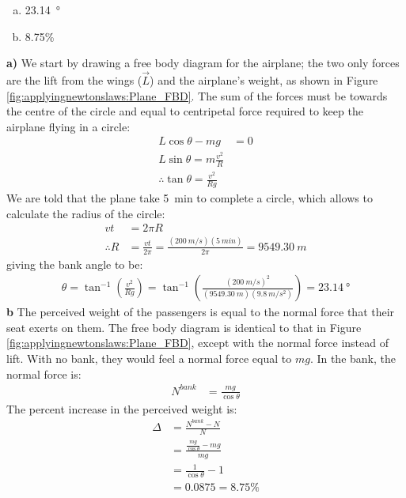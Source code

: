 \begin{finalanswer}
\begin{enumerate}[(a)]
\item \SI{23.14}{\degree}
\item 8.75\%
\end{enumerate}
\end{finalanswer}
\begin{solution}
\textbf{a)} We start by drawing a free body diagram for the airplane; the two only forces are the lift from the wings ($\vec L$) and the airplane's weight, as shown in Figure \ref{fig:applyingnewtonslaws:Plane_FBD}.
The sum of the forces must be towards the centre of the circle and equal to centripetal force required to keep the airplane flying in a circle:
\begin{align*}
L\cos\theta-mg&=0\\
L\sin\theta=m\frac{v^2}{R}\\
\therefore \tan\theta = \frac{v^2}{Rg}
\end{align*}
We are told that the plane take \SI{5}{min} to complete a circle, which allows to calculate the radius of the circle:
\begin{align*}
vt&=2\pi R\\
\therefore R&=\frac{vt}{2\pi}=\frac{(\SI{200}{m/s})(\SI{5}{min})}{2\pi}=\SI{9549.30}{m}
\end{align*}
giving the bank angle to be:
\begin{align*}
\theta = \tan^{-1}\left(\frac{v^2}{Rg}\right)=\tan^{-1}\left(\frac{(\SI{200}{m/s})^2}{(\SI{9549.30}{m})(\SI{9.8}{m/s^2})}\right)=\SI{23.14}{\degree}
\end{align*}
\textbf{b} The perceived weight of the passengers is equal to the normal force that their seat exerts on them. The free body diagram is identical to that in Figure \ref{fig:applyingnewtonslaws:Plane_FBD}, except with the normal force instead of lift.  With no bank, they would feel a normal force equal to $mg$. In the bank, the normal force is:
\begin{align*}
N^{bank}&=\frac{mg}{\cos\theta}
\end{align*}
The percent increase in the perceived weight is:
\begin{align*}
\Delta &= \frac{N^{bank}-N}{N}\\
&=\frac{\frac{mg}{\cos\theta}-mg}{mg}\\
&=\frac{1}{\cos\theta} - 1 \\
&=0.0875=8.75\%
\end{align*}
\end{solution}

